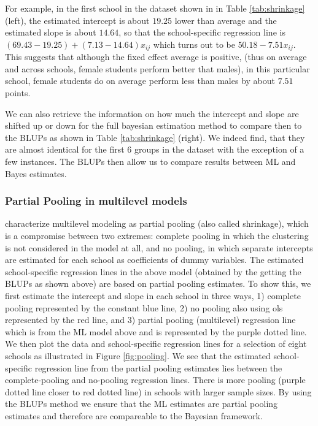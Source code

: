 For example, in the first school in the dataset shown in in Table \ref{tab:shrinkage} (left), the estimated intercept is about $19.25$ lower than average and the estimated slope is about $14.64$, so that the school-specific regression line is $(69.43 - 19.25) + (7.13 - 14.64) x_{ij}$ which turns out to be $ 50.18 - 7.51  x_{ij}$. This suggests that although the fixed effect average is positive, (thus on average and across schools, female students perform better that males), in this particular school, female students do on average perform less than males by about $7.51$ points.

We can also retrieve the information on how much the intercept and slope are shifted up or down for the full bayesian estimation method to compare then to the BLUPs as shown in Table \ref{tab:shrinkage} (right). We indeed find, that they are almost identical for the first 6 groups in the dataset with the exception of a few instances. The BLUPs then allow us to compare results between ML and Bayes estimates.

\subsubsection*{Partial Pooling in multilevel models}
\cite{gelman2006data} characterize multilevel modeling as partial pooling (also called shrinkage), which is a compromise between two extremes: complete pooling in which the clustering is not considered in the model at all, and no pooling, in which separate intercepts are estimated for each school as coefficients of dummy variables. The estimated school-specific regression lines in the above model (obtained by the getting the BLUPs as shown above) are based on partial pooling estimates. To show this, we first estimate the intercept and slope in each school in three ways, 1) complete pooling represented by the constant blue line, 2) no pooling also using ols represented by the red line, and 3) partial pooling (multilevel) regression line which is from the ML model above and is represented by the purple dotted line. We then plot the data and school-specific regression lines for a selection of eight schools as illustrated in Figure \ref{fig:pooling}. We see that the estimated school-specific regression line from the partial pooling estimates lies between the complete-pooling and no-pooling regression lines. There is more pooling (purple dotted line closer to red dotted line) in schools with larger sample sizes. By using the BLUPs method we ensure that the ML estimates are partial pooling estimates and therefore are compareable to the Bayesian framework.

